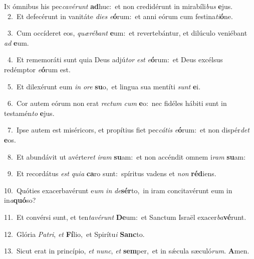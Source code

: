 \lettrine{\initial\textcolor{\initialcolor}{I}}{n} ómnibus his pec\-\textit{ca}\-\textit{vé}\textit{runt} \textbf{ad}\-huc:~\star et non credidérunt in mirabíli\textit{bus} \textbf{e}\-jus.\\
{\numbfont\textcolor{\numbcolor}{~2.}}~Et defecérunt in vanitáte \textit{di}\-\textit{es} \textit{e}\-\textbf{ó}rum:~\star et anni eórum cum festina\-\textit{ti}\-\textbf{ó}ne.\par
{\numbfont\textcolor{\numbcolor}{~3.}}~Cum occíderet eos, \textit{quæ}\-\textit{ré}\textit{bant} \textbf{e}\-um:~\star et revertebántur, et dilúculo veniébant \textit{ad} \textbf{e}\-um.\par
{\numbfont\textcolor{\numbcolor}{~4.}}~Et rememoráti sunt quia Deus adjú\textit{tor} \textit{est} \textit{e}\-\textbf{ó}rum:~\star et Deus excélsus redémptor \textit{e}\-\textbf{ó}rum est.\par
{\numbfont\textcolor{\numbcolor}{~5.}}~Et dilexérunt eum \textit{in} \textit{o}\-\textit{re} \textbf{su}\-o,~\star et lingua sua mentíti \textit{sunt} \textbf{e}\-i.\par
{\numbfont\textcolor{\numbcolor}{~6.}}~Cor autem eórum non erat \textit{rec}\-\textit{tum} \textit{cum} \textbf{e}\-o:~\star nec fidéles hábiti sunt in testamén\textit{to} \textbf{e}\-jus.\par
{\numbfont\textcolor{\numbcolor}{~7.}}~Ipse autem est miséricors, et propítius fiet pec\-\textit{cá}\-\textit{tis} \textit{e}\-\textbf{ó}rum:~\star et non dispér\textit{det} \textbf{e}\-os.\par
{\numbfont\textcolor{\numbcolor}{~8.}}~Et abundávit ut avérte\textit{ret} \textit{i}\-\textit{ram} \textbf{su}\-am:~\star et non accéndit omnem i\textit{ram} \textbf{su}\-am:\par
{\numbfont\textcolor{\numbcolor}{~9.}}~Et recordátus \textit{est} \textit{qui}\-\textit{a} \textbf{ca}\-ro sunt:~\star spíritus vadens et \textit{non} \textbf{réd}\-iens.\par
{\numbfont\textcolor{\numbcolor}{10.}}~Quóties exacerbavérunt e\textit{um} \textit{in} \textit{de}\-\textbf{sér}to,~\star in iram concitavérunt eum in in\-\textit{a}\-\textbf{quó}so?\par
{\numbfont\textcolor{\numbcolor}{11.}}~Et convérsi sunt, et ten\-\textit{ta}\-\textit{vé}\textit{runt} \textbf{De}\-um:~\star et Sanctum Israël exacer\-\textit{ba}\-\textbf{vé}runt.\par
{\numbfont\textcolor{\numbcolor}{12.}}~Glória \textit{Pa}\-\textit{tri}, \textit{et} \textbf{Fí}\-lio,~\star et Spirítu\textit{i} \textbf{Sanc}\-to.\par
{\numbfont\textcolor{\numbcolor}{13.}}~Sicut erat in princípio, \textit{et} \textit{nunc}\-, \textit{et} \textbf{sem}\-per,~\star et in sǽcula sæculó\-\textit{rum}\-. \textbf{A}\-men.\par
